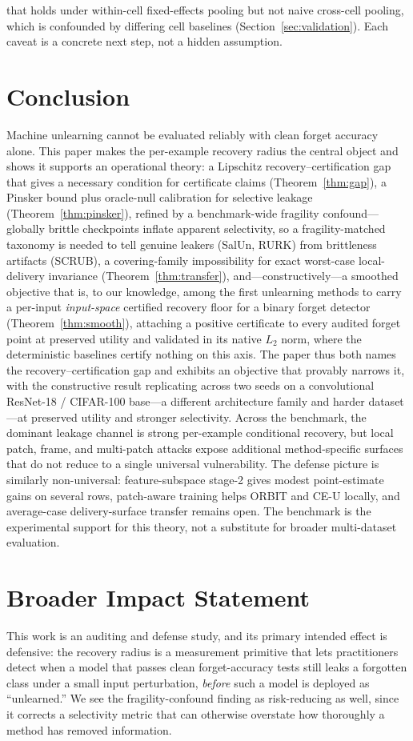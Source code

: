 \documentclass{article}
\begin{document}
that holds under within-cell fixed-effects pooling but not naive cross-cell pooling, which is confounded by differing cell baselines (Section~\ref{sec:validation}). Each caveat is a concrete next step, not a hidden assumption.

\FloatBarrier
\section{Conclusion}
Machine unlearning cannot be evaluated reliably with clean forget accuracy alone. This paper makes the per-example recovery radius the central object and shows it supports an operational theory: a Lipschitz recovery--certification gap that gives a necessary condition for certificate claims (Theorem~\ref{thm:gap}), a Pinsker bound plus oracle-null calibration for selective leakage (Theorem~\ref{thm:pinsker}), refined by a benchmark-wide fragility confound---globally brittle checkpoints inflate apparent selectivity, so a fragility-matched taxonomy is needed to tell genuine leakers (SalUn, RURK) from brittleness artifacts (SCRUB), a covering-family impossibility for exact worst-case local-delivery invariance (Theorem~\ref{thm:transfer}), and---constructively---a smoothed objective that is, to our knowledge, among the first unlearning methods to carry a per-input \emph{input-space} certified recovery floor for a binary forget detector (Theorem~\ref{thm:smooth}), attaching a positive certificate to every audited forget point at preserved utility and validated in its native $L_2$ norm, where the deterministic baselines certify nothing on this axis. The paper thus both names the recovery--certification gap and exhibits an objective that provably narrows it, with the constructive result replicating across two seeds on a convolutional ResNet-18 / CIFAR-100 base---a different architecture family and harder dataset---at preserved utility and stronger selectivity. Across the benchmark, the dominant leakage channel is strong per-example conditional recovery, but local patch, frame, and multi-patch attacks expose additional method-specific surfaces that do not reduce to a single universal vulnerability. The defense picture is similarly non-universal: feature-subspace stage-2 gives modest point-estimate gains on several rows, patch-aware training helps ORBIT and CE-U locally, and average-case delivery-surface transfer remains open. The benchmark is the experimental support for this theory, not a substitute for broader multi-dataset evaluation.

\section*{Broader Impact Statement}
This work is an auditing and defense study, and its primary intended effect is defensive: the recovery radius is a measurement primitive that lets practitioners detect when a model that passes clean forget-accuracy tests still leaks a forgotten class under a small input perturbation, \emph{before} such a model is deployed as ``unlearned.'' We see the fragility-confound finding as risk-reducing as well, since it corrects a selectivity metric that can otherwise overstate how thoroughly a method has removed information.
\end{document}
